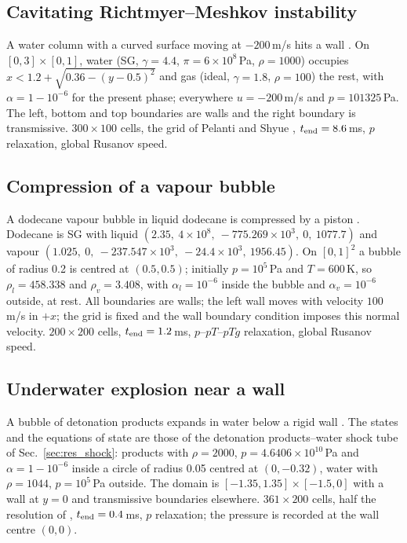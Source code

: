 \subsection{Cavitating Richtmyer--Meshkov instability}
\label{sec:res_rm}
A water column with a curved surface moving at $-200$\,m/s hits a wall \cite[Sec.~4.7]{SPB2009}. On $[0,3]\times[0,1]$,
water (SG, $\gamma=4.4$, $\pi=6\times10^8$\,Pa, $\rho=1000$) occupies $x<1.2+\sqrt{0.36-(y-0.5)^2}$ and gas (ideal, $\gamma=1.8$,
$\rho=100$) the rest, with $\alpha=1-10^{-6}$ for the present phase; everywhere $u=-200$\,m/s and $p=101325$\,Pa. The left,
bottom and top boundaries are walls and the right boundary is transmissive. $300\times100$ cells, the grid of Pelanti and Shyue \cite[Sec.~5.3]{PelantiShyue2014}, $t_{\rm end}=8.6$\,ms,
$p$ relaxation, global Rusanov speed.

\subsection{Compression of a vapour bubble}
\label{sec:res_bubble}
A dodecane vapour bubble in liquid dodecane is compressed by a piston \cite[Sec.~5.4]{PelantiShyue2014}. Dodecane is SG
with liquid $(2.35,\ 4\times10^8,\ -775.269\times10^3,\ 0,\ 1077.7)$ and vapour $(1.025,\ 0,\ -237.547\times10^3,\ -24.4\times10^3,\ 1956.45)$. On $[0,1]^2$ a bubble of radius 0.2 is centred at $(0.5,0.5)$;
initially $p=10^5$\,Pa and $T=600$\,K, so $\rho_l=458.338$ and $\rho_v=3.408$, with $\alpha_l=10^{-6}$ inside the bubble and
$\alpha_v=10^{-6}$ outside, at rest. All boundaries are walls; the left wall moves with velocity $100$\,m/s in $+x$; the grid
is fixed and the wall boundary condition imposes this normal velocity. $200\times200$ cells, $t_{\rm end}=1.2$\,ms,
$p$--$pT$--$pTg$ relaxation, global Rusanov speed.

\subsection{Underwater explosion near a wall}
\label{sec:res_undex}
A bubble of detonation products expands in water below a rigid wall \cite[Sec.~8.1.2]{Pelanti2022}. The states and the
equations of state are those of the detonation products--water shock tube of Sec.~\ref{sec:res_shock}: products with
$\rho=2000$, $p=4.6406\times10^{10}$\,Pa and $\alpha=1-10^{-6}$ inside a circle of radius 0.05 centred at $(0,-0.32)$, water with
$\rho=1044$, $p=10^5$\,Pa outside. The domain is $[-1.35,1.35]\times[-1.5,0]$ with a wall at $y=0$ and transmissive
boundaries elsewhere. $361\times200$ cells, half the resolution of \cite{Pelanti2022}, $t_{\rm end}=0.4$\,ms, $p$ relaxation; the pressure is recorded at the wall
centre $(0,0)$.
